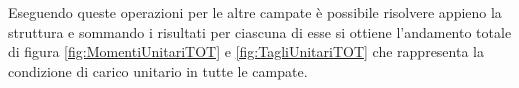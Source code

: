 Eseguendo queste operazioni per le altre campate è possibile risolvere appieno la struttura e sommando i risultati per ciascuna di esse si ottiene l'andamento totale di figura \ref{fig:MomentiUnitariTOT} e \ref{fig:TagliUnitariTOT} che rappresenta la condizione di carico unitario in tutte le campate.
\begin{figure}[p]
\centering
{} \quad
{} \\
 \quad
{} \\
 \quad

\end{figure}

